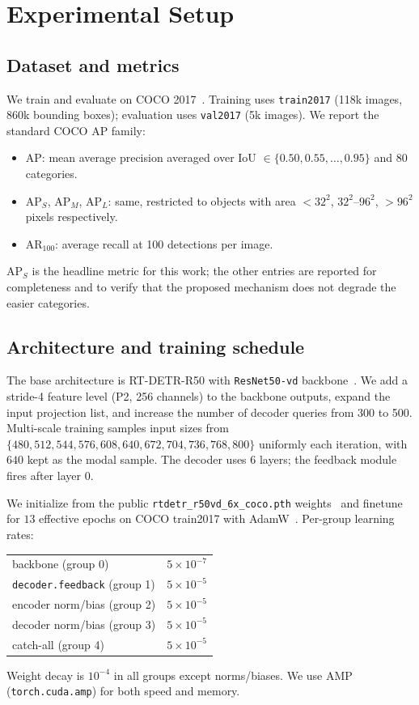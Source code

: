 \section{Experimental Setup}
\label{sec:exp}

\subsection{Dataset and metrics}
We train and evaluate on COCO 2017~\cite{lin2014coco}. Training uses \texttt{train2017} (118k images, 860k bounding boxes); evaluation uses \texttt{val2017} (5k images). We report the standard COCO AP family:
\begin{itemize}
    \item $\mathrm{AP}$: mean average precision averaged over IoU $\in \{0.50, 0.55, \ldots, 0.95\}$ and 80 categories.
    \item $\mathrm{AP}_S$, $\mathrm{AP}_M$, $\mathrm{AP}_L$: same, restricted to objects with area $< 32^2$, $32^2$--$96^2$, $> 96^2$ pixels respectively.
    \item $\mathrm{AR}_{100}$: average recall at 100 detections per image.
\end{itemize}
$\mathrm{AP}_S$ is the headline metric for this work; the other entries are reported for completeness and to verify that the proposed mechanism does not degrade the easier categories.

\subsection{Architecture and training schedule}
The base architecture is RT-DETR-R50 with \texttt{ResNet50-vd} backbone~\cite{he2016resnet}. We add a stride-4 feature level (P2, 256 channels) to the backbone outputs, expand the input projection list, and increase the number of decoder queries from 300 to 500. Multi-scale training samples input sizes from $\{480, 512, 544, 576, 608, 640, 672, 704, 736, 768, 800\}$ uniformly each iteration, with $640$ kept as the modal sample. The decoder uses 6 layers; the feedback module fires after layer 0.

We initialize from the public \texttt{rtdetr\_r50vd\_6x\_coco.pth} weights~\cite{lyu2024rtdetr} and finetune for $13$ effective epochs on COCO train2017 with AdamW~\cite{loshchilov2019adamw}. Per-group learning rates:
\begin{center}
\begin{tabular}{ll}
    backbone (group 0) & $5\times10^{-7}$ \\
    \texttt{decoder.feedback} (group 1) & $5\times10^{-5}$ \\
    encoder norm/bias (group 2) & $5\times10^{-5}$ \\
    decoder norm/bias (group 3) & $5\times10^{-5}$ \\
    catch-all (group 4) & $5\times10^{-5}$ \\
\end{tabular}
\end{center}
Weight decay is $10^{-4}$ in all groups except norms/biases. We use AMP (\texttt{torch.cuda.amp}) for both speed and memory.

